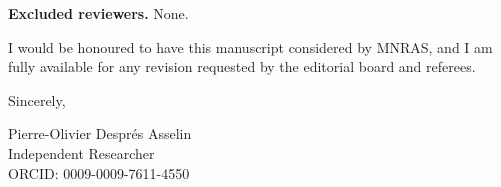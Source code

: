 \documentclass[12pt]{article}
\begin{document}
\bigskip

\textbf{Excluded reviewers.}
None.

\bigskip

I would be honoured to have this manuscript considered by MNRAS, and I
am fully available for any revision requested by the editorial board
and referees.

\bigskip

Sincerely,

\bigskip

\noindent
Pierre-Olivier Despr\'{e}s Asselin \\
Independent Researcher \\
ORCID: 0009-0009-7611-4550
\end{document}
